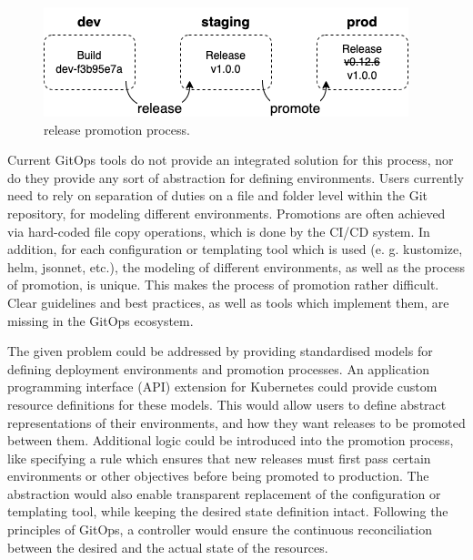 \begin{figure}[h]
	\centering
	\includegraphics[width=.55\linewidth]{figures/release-promotion.drawio.png}
	\caption{release promotion process.
	}
	\label{fig:releasePromotionProcess}	
\end{figure}

\noindent
Current GitOps tools do not provide an integrated solution for this process,
nor do they provide any sort of abstraction for defining environments.
Users currently need to rely on separation of duties
on a file and folder level within the Git repository,
for modeling different environments.
Promotions are often achieved via hard-coded file copy operations,
which is done by the CI/CD system.
In addition, for each configuration or templating tool which is used
(e. g. kustomize, helm, jsonnet, etc.),
the modeling of different environments, as well as the
process of promotion, is unique.
This makes the process of promotion rather difficult.
Clear guidelines and best practices,
as well as tools which implement them,
are missing in the GitOps ecosystem.
\bigskip


\noindent
%
The given problem could be addressed by
providing standardised models 
for defining deployment environments and promotion processes.
%
An application programming interface (API) extension for Kubernetes
could provide custom resource definitions for these models.
%
This would allow users to define abstract representations of
their environments,
and how they want releases to be promoted between them.
%
Additional logic could be introduced into the promotion process,
like specifying a rule which ensures that new releases must first pass
certain environments or other objectives before being promoted to production.
%
The abstraction would also enable transparent replacement of the
configuration or templating tool,
while keeping the desired state definition intact.
%
Following the principles of GitOps,
a controller would ensure the continuous reconciliation
between the desired and the actual state of the resources.
\bigskip

